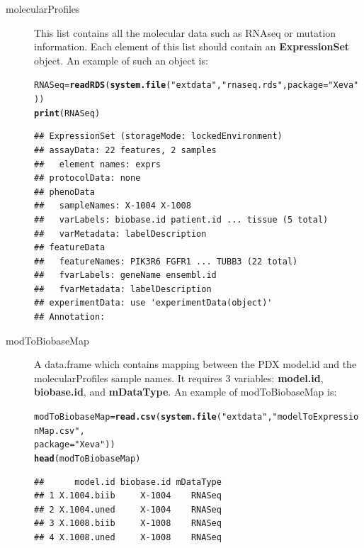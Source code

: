 \documentclass{article}\usepackage[]{graphicx}\usepackage[]{xcolor}
\makeatletter
\newcommand{\hlstr}[1]{\textcolor[rgb]{0.192,0.494,0.8}{#1}}%
\newcommand{\hlstd}[1]{\textcolor[rgb]{0.345,0.345,0.345}{#1}}%
\newcommand{\hlkwb}[1]{\textcolor[rgb]{0.69,0.353,0.396}{#1}}%
\newcommand{\hlkwc}[1]{\textcolor[rgb]{0.333,0.667,0.333}{#1}}%
\newcommand{\hlkwd}[1]{\textcolor[rgb]{0.737,0.353,0.396}{\textbf{#1}}}%
\newenvironment{kframe}{%
 \def\at@end@of@kframe{}%
 \ifinner\ifhmode%
  \def\at@end@of@kframe{\end{minipage}}%
  \begin{minipage}{\columnwidth}%
 \fi\fi%
 \def\FrameCommand##1{\hskip\@totalleftmargin \hskip-\fboxsep
 \colorbox{shadecolor}{##1}\hskip-\fboxsep
     \hskip-\linewidth \hskip-\@totalleftmargin \hskip\columnwidth}%
 \MakeFramed {\advance\hsize-\width
   \@totalleftmargin\z@ \linewidth\hsize
   \@setminipage}}%
 {\par\unskip\endMakeFramed%
 \at@end@of@kframe}
\newenvironment{knitrout}{}{} %
\makeatother
\begin{document}
\begin{description}
\item[molecularProfiles]
This list contains all the molecular data such as RNAseq or mutation information.
Each element of this list should contain an \textbf{ExpressionSet} object.
An example of such an object is:
\begin{knitrout}
\color{fgcolor}\begin{kframe}
\begin{alltt}
\hlstd{RNASeq}\hlkwb{=}\hlkwd{readRDS}\hlstd{(}\hlkwd{system.file}\hlstd{(}\hlstr{"extdata"}\hlstd{,} \hlstr{"rnaseq.rds"}\hlstd{,} \hlkwc{package} \hlstd{=} \hlstr{"Xeva"}\hlstd{))}
\hlkwd{print}\hlstd{(RNASeq)}
\end{alltt}
\begin{verbatim}
## ExpressionSet (storageMode: lockedEnvironment)
## assayData: 22 features, 2 samples 
##   element names: exprs 
## protocolData: none
## phenoData
##   sampleNames: X-1004 X-1008
##   varLabels: biobase.id patient.id ... tissue (5 total)
##   varMetadata: labelDescription
## featureData
##   featureNames: PIK3R6 FGFR1 ... TUBB3 (22 total)
##   fvarLabels: geneName ensembl.id
##   fvarMetadata: labelDescription
## experimentData: use 'experimentData(object)'
## Annotation:
\end{verbatim}
\end{kframe}
\end{knitrout}

\item[modToBiobaseMap]
A data.frame which contains mapping between the PDX model.id and the molecularProfiles sample names.
It requires 3 variables: \textbf{model.id}, \textbf{biobase.id}, and \textbf{mDataType}.
An example of modToBiobaseMap is:
\begin{knitrout}
\color{fgcolor}\begin{kframe}
\begin{alltt}
\hlstd{modToBiobaseMap}\hlkwb{=}\hlkwd{read.csv}\hlstd{(}\hlkwd{system.file}\hlstd{(}\hlstr{"extdata"}\hlstd{,}\hlstr{"modelToExpressionMap.csv"}\hlstd{,}
                                     \hlkwc{package} \hlstd{=} \hlstr{"Xeva"}\hlstd{))}
\hlkwd{head}\hlstd{(modToBiobaseMap)}
\end{alltt}
\begin{verbatim}
##      model.id biobase.id mDataType
## 1 X.1004.biib     X-1004    RNASeq
## 2 X.1004.uned     X-1004    RNASeq
## 3 X.1008.biib     X-1008    RNASeq
## 4 X.1008.uned     X-1008    RNASeq
\end{verbatim}
\end{kframe}
\end{knitrout}

\end{description}
\end{document}
